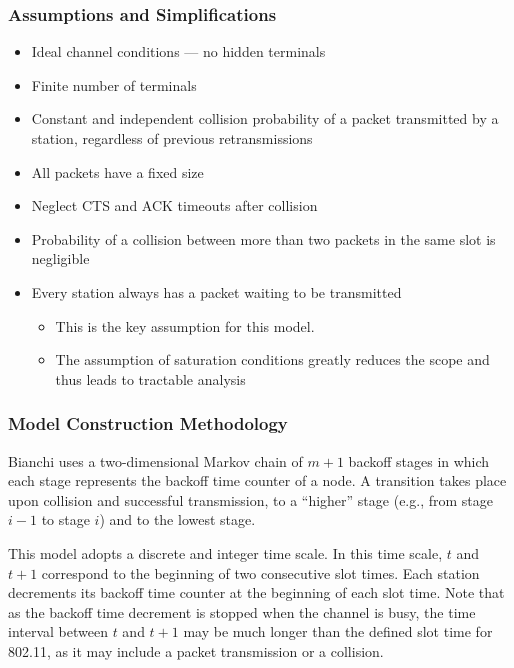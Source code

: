 \subsubsection{Assumptions and Simplifications}\label{subsubsec:Bianchi_Model_Assumptions}
\begin{itemize}[noitemsep]
\item Ideal channel conditions — no hidden terminals
\item Finite number of terminals
\item Constant and independent collision probability of a packet transmitted by a station, regardless of previous retransmissions
\item All packets have a fixed size
\item Neglect CTS and ACK timeouts after collision
\item Probability of a collision between more than two packets in the same slot is negligible
\item Every station always has a packet waiting to be transmitted
  \begin{itemize}[noitemsep]
  \item This is the key assumption for this model.
  \item The assumption of saturation conditions greatly reduces the
    scope and thus leads to tractable analysis
  \end{itemize}
\end{itemize}

\subsubsection{Model Construction Methodology}\label{subsubsec:Bianchi_Model_Method}
Bianchi uses a two-dimensional Markov chain of $m + 1$ backoff stages in which each stage represents the backoff time counter of a node.
A transition takes place upon collision and successful transmission, to a ``higher'' stage (e.g., from stage $i - 1$ to stage $i$) and to the lowest stage.

This model adopts a discrete and integer time scale.
In this time scale, $t$ and $t + 1$ correspond to the beginning of two consecutive slot times.
Each station decrements its backoff time counter at the beginning of each slot time.
Note that as the backoff time decrement is stopped when the channel is busy, the time interval between $t$ and $t + 1$ may be much longer than the defined slot time for 802.11, as it may include a packet transmission or a collision.

